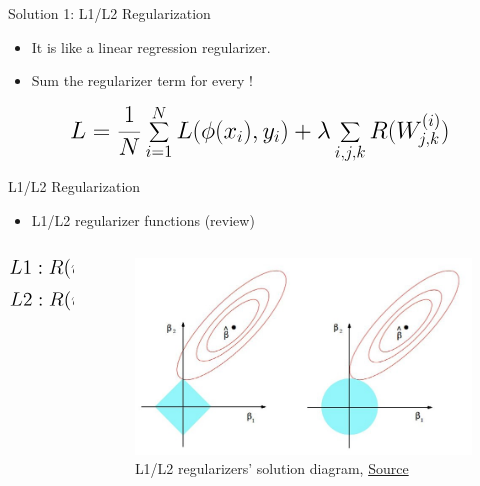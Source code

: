 \begin{frame}{Solution 1: L1/L2 Regularization}
    \begin{itemize}
        \item It is like a linear regression regularizer.
        \item Sum the regularizer term for every !
    \end{itemize}
    \vspace{0.2\textheight}
    \begin{equation*}
        \mathlarger{\mathlarger{\mathlarger{
        L = \frac{1}{N} \sum_{i=1}^{N} L(\phi(x_i), y_i) + \lambda \sum_{i,j,k} R(W_{j,k}^{(i)})
        }}}
    \end{equation*}
\end{frame}
\begin{frame}{L1/L2 Regularization}
    \begin{itemize}
        \item L1/L2 regularizer functions (review)
    \end{itemize}
	\begin{columns}
		\begin{column}[c]{0.5\textwidth}
			\centering
			\begin{equation*}
				\centering
				\mathlarger{\mathlarger{
							L1: R(w) = \vert w\vert
				}}
			\end{equation*}
			\begin{equation*}
				\centering
				\mathlarger{\mathlarger{
							L2: R(w) = w^2
				}}
			\end{equation*}
		\end{column}
		\begin{column}[c]{0.5\textwidth}
			\begin{figure}[H]
				\centering
				\includegraphics[width=\textwidth]{Figs/section_4/l1l2_reg.jpeg}
				\caption{L1/L2 regularizers' solution diagram, \href{https://towardsdatascience.com/understanding-l1-and-l2-regularization-93918a5ac8d0}{Source}}
			\end{figure}
		\end{column}
	\end{columns}
    

\end{frame}
